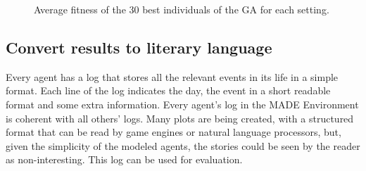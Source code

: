 \documentclass[letterpaper]{article}
\begin{document}
\begin{figure}[htb]
{   \label{fig:subfig2}
}
\caption{Average fitness of the 30 best individuals of the GA for each setting.}
\label{fig:graph}
\end{figure}







\subsection{Convert results to literary language}

Every agent has a log that stores all the relevant events in its life
in a simple format. Each line of the log indicates the day, the event
in a short readable format and some extra information. Every agent's
log in the MADE Environment is coherent with all others' logs. Many
plots are being created, with a structured format that can be read by
game engines or natural language processors, but, given the simplicity
of the modeled agents, the stories could be seen by the reader as
non-interesting. This log can be used for evaluation.
\end{document}
